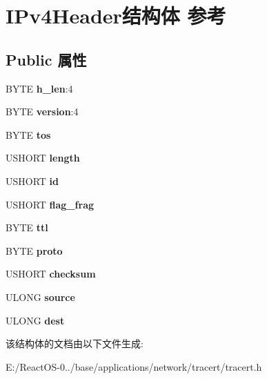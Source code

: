 \hypertarget{struct_i_pv4_header}{}\section{I\+Pv4\+Header结构体 参考}
\label{struct_i_pv4_header}
\subsection*{Public 属性}
\begin{DoxyCompactItemize}
\item 
\mbox{\label{struct_i_pv4_header_a56a558e060b792639fe85a9d2f088940}} 
B\+Y\+TE {\bfseries h\+\_\+len}\+:4
\item 
\mbox{\label{struct_i_pv4_header_a521e8505513d363a22461e1296174dc6}} 
B\+Y\+TE {\bfseries version}\+:4
\item 
\mbox{\label{struct_i_pv4_header_af09b21020b0bfe093311fbfca8b1e1cd}} 
B\+Y\+TE {\bfseries tos}
\item 
\mbox{\label{struct_i_pv4_header_a05b6c34e84ea580e7ec8096ea89f3f3d}} 
U\+S\+H\+O\+RT {\bfseries length}
\item 
\mbox{\label{struct_i_pv4_header_a5b27f47ae5b5b427ae40a2f908cee671}} 
U\+S\+H\+O\+RT {\bfseries id}
\item 
\mbox{\label{struct_i_pv4_header_a36b3eef68f2737ef040eb545d971ed19}} 
U\+S\+H\+O\+RT {\bfseries flag\+\_\+frag}
\item 
\mbox{\label{struct_i_pv4_header_a362971c03c1b5767005f86a1accef9cd}} 
B\+Y\+TE {\bfseries ttl}
\item 
\mbox{\label{struct_i_pv4_header_a0bf663384f6c63e043316ce51f4f4a72}} 
B\+Y\+TE {\bfseries proto}
\item 
\mbox{\label{struct_i_pv4_header_a503a4189719fde4e592facd22fd45eac}} 
U\+S\+H\+O\+RT {\bfseries checksum}
\item 
\mbox{\label{struct_i_pv4_header_a7ca22c3b0dbfc685614c41af40ecddee}} 
U\+L\+O\+NG {\bfseries source}
\item 
\mbox{\label{struct_i_pv4_header_a2b43e5bb4d0329518ec4c0b5f5249450}} 
U\+L\+O\+NG {\bfseries dest}
\end{DoxyCompactItemize}


该结构体的文档由以下文件生成\+:\begin{DoxyCompactItemize}
\item 
E\+:/\+React\+O\+S-\/0../base/applications/network/tracert/tracert.\+h\end{DoxyCompactItemize}
